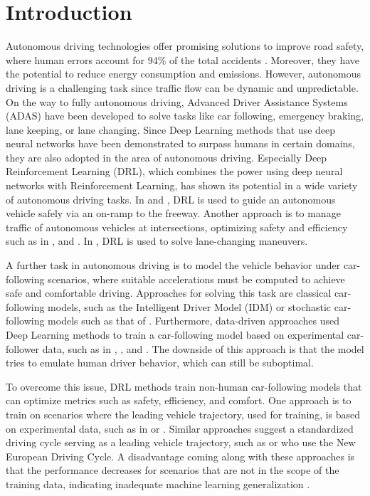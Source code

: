\documentclass[review]{elsarticle}
\providecommand{\3}{{\ss}}
\begin{document}
	
	\section{Introduction}
	Autonomous driving technologies offer promising solutions to
	improve road safety, where human errors account for 94\% of the total
	accidents \citep{vehicleCrashSurvey2015}.  
	Moreover, they have the potential to reduce energy consumption and emissions. 
	However, autonomous driving is a challenging task
	since traffic flow can be dynamic and unpredictable.
	On the way to fully autonomous driving, Advanced Driver Assistance Systems
	(ADAS) have been developed to solve tasks like car following, emergency
	braking, lane keeping, or lane changing. 
	Since Deep Learning methods that use deep neural networks have been demonstrated to surpass humans
	in certain domains, they are also adopted in the area of autonomous
	driving.
	Especially Deep Reinforcement Learning (DRL), which combines the power
	using deep neural networks with Reinforcement Learning, has shown its potential in a wide variety of autonomous driving tasks. 
	In \cite{OnRampMerge2018} and \cite{OnRampMerge2020}, DRL is used to
	guide an autonomous vehicle safely via an on-ramp to the freeway. Another approach is to manage traffic of autonomous vehicles at intersections, optimizing safety and efficiency such as in \cite{intersection1}, \cite{intersection3} and \cite{intersection2}.
	In \cite{LangeChange1}, DRL is used to solve lane-changing maneuvers.
	
	A further task in autonomous driving is to model the vehicle behavior
	under car-following scenarios, where suitable accelerations must be
	computed to achieve safe and comfortable driving. Approaches
	for solving this task are classical car-following models, such as the
	Intelligent Driver Model (IDM) \citep{Opus} or stochastic car-following
	models such as that of \cite{Treiber2018stochIDM_TRB}. Furthermore, data-driven approaches used Deep Learning methods to train a car-following model based on experimental car-follower data, such as in \cite{Chong2011SimulationOD}, \cite{ZHOU2017245}, \cite{HumanLikeCF} and \cite{HumanLikeCF2}. The downside of this approach is that the model tries to emulate human driver behavior, which can still be suboptimal.
	
	To overcome this issue, DRL methods train non-human car-following models that can optimize metrics such as safety, efficiency, and comfort. 
	One approach is to train on scenarios where the leading vehicle
	trajectory, used for training, is based on experimental data, such as
	in \cite{SafeEfficientAndComfortable} or
	\cite{HumanLikeAutonomouCF}. Similar approaches suggest a standardized
	driving cycle serving as a leading vehicle trajectory, such
	as \cite{ComparisonRLvsMPC} or \cite{CFelectricVehicle}
	who use the New European Driving Cycle.
	A disadvantage coming along with these approaches is that the
	performance decreases for scenarios that are not in the scope of the training data, indicating inadequate machine learning generalization \citep{ComparisonRLvsMPC}. 
	
\end{document}
